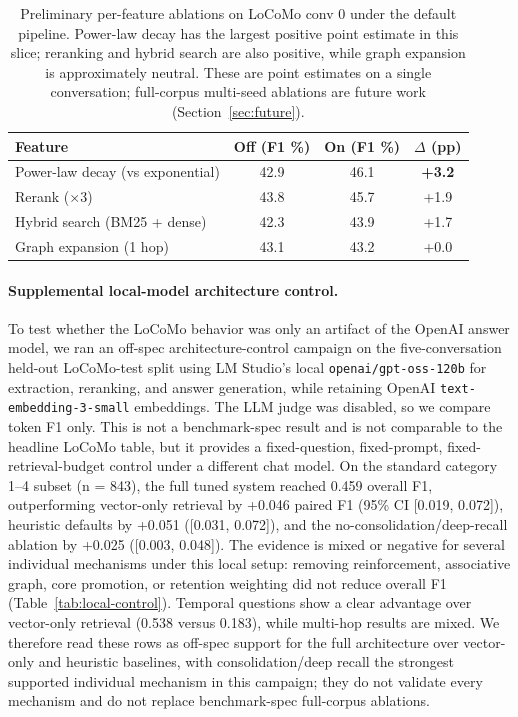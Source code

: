 \documentclass[11pt,a4paper]{article}
\begin{document}
\begin{table}[htbp]
\centering
\small
\begin{tabular}{@{}lccc@{}}
\toprule
\textbf{Feature} & \textbf{Off (F1 \%)} & \textbf{On (F1 \%)} & \textbf{$\Delta$ (pp)} \\
\midrule
Power-law decay (vs exponential) & 42.9 & 46.1 & \textbf{+3.2} \\
Rerank ($\times$3) & 43.8 & 45.7 & +1.9 \\
Hybrid search (BM25 + dense) & 42.3 & 43.9 & +1.7 \\
Graph expansion (1 hop) & 43.1 & 43.2 & +0.0 \\
\bottomrule
\end{tabular}
\caption{Preliminary per-feature ablations on LoCoMo conv 0 under the default pipeline. Power-law decay has the largest positive point estimate in this slice; reranking and hybrid search are also positive, while graph expansion is approximately neutral. These are point estimates on a single conversation; full-corpus multi-seed ablations are future work (Section~\ref{sec:future}).}
\label{tab:ablations}
\end{table}

\paragraph{Supplemental local-model architecture control.}
To test whether the LoCoMo behavior was only an artifact of the OpenAI answer model, we ran an off-spec architecture-control campaign on the five-conversation held-out LoCoMo-test split using LM Studio's local \texttt{openai/gpt-oss-120b} for extraction, reranking, and answer generation, while retaining OpenAI \texttt{text-embedding-3-small} embeddings. The LLM judge was disabled, so we compare token F1 only. This is not a benchmark-spec result and is not comparable to the headline LoCoMo table, but it provides a fixed-question, fixed-prompt, fixed-retrieval-budget control under a different chat model. On the standard category 1--4 subset (n = 843), the full tuned system reached 0.459 overall F1, outperforming vector-only retrieval by +0.046 paired F1 (95\% CI [0.019, 0.072]), heuristic defaults by +0.051 ([0.031, 0.072]), and the no-consolidation/deep-recall ablation by +0.025 ([0.003, 0.048]). The evidence is mixed or negative for several individual mechanisms under this local setup: removing reinforcement, associative graph, core promotion, or retention weighting did not reduce overall F1 (Table~\ref{tab:local-control}). Temporal questions show a clear advantage over vector-only retrieval (0.538 versus 0.183), while multi-hop results are mixed. We therefore read these rows as off-spec support for the full architecture over vector-only and heuristic baselines, with consolidation/deep recall the strongest supported individual mechanism in this campaign; they do not validate every mechanism and do not replace benchmark-spec full-corpus ablations.
\end{document}
